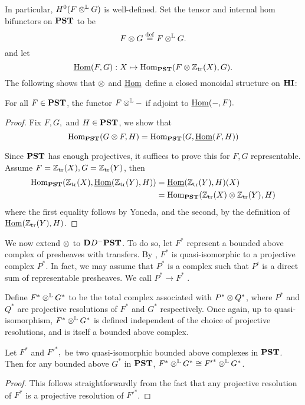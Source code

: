 In particular, $H^0(F \otimes^{\mathbb{L}} G)$ is well-defined. Set the tensor and
internal hom bifunctors on $\mathbf{PST}$ to be
\[
F \otimes G \stackrel{\mathrm{def}}{=} F \otimes^{\mathbb{L}} G.
\]
and let 
\[
\underline{\mathrm{Hom}}(F, G): X \mapsto \mathrm{Hom}_{\mathbf{PST}}(F \otimes \mathbb{Z}_{\mathrm{tr}}(X), G).
\]
The following shows that $\otimes$ and $\underline{\mathrm{Hom}}$ define a closed
monoidal structure on $\mathbf{HI}$:
\begin{lem}
For all $F \in \mathbf{PST}$, the functor $F \otimes^{\mathbb{L}} -$ if adjoint to 
$\underline{\mathrm{Hom}}(-, F).$
\end{lem}
\begin{proof}
Fix $F, G,$ and $H \in \mathbf{PST}$, we show that
\[
\mathrm{Hom}_{\mathbf{PST}}(G \otimes F, H) = \mathrm{Hom}_{\mathbf{PST}}(G, \underline{\mathrm{Hom}}(F, H))
\]

Since $\mathbf{PST}$ has enough projectives, it suffices to prove this 
for $F, G$ representable. Assume $F = \mathbb{Z}_{\mathrm{tr}}(X), G = \mathbb{Z}_{\mathrm{tr}}(Y)$,
then 
\begin{align*}
\mathrm{Hom}_{\mathbf{PST}}(\mathbb{Z}_{\mathrm{tr}}(X), \underline{\mathrm{Hom}}(\mathbb{Z}_{\mathrm{tr}}(Y), H)) &=
\underline{\mathrm{Hom}}(\mathbb{Z}_{\mathrm{tr}}(Y), H)(X) \\
&= \mathrm{Hom}_{\mathbf{PST}}(\mathbb{Z}_{\mathrm{tr}}(X) \otimes \mathbb{Z}_{\mathrm{tr}}(Y), H)
\end{align*}
where the first equality follows by Yoneda, and the second, by
the definition of $\underline{\mathrm{Hom}}(\mathbb{Z}_{\mathrm{tr}}(Y), H)$.
\end{proof}

We now extend $\otimes$ to $\mathbf{D}{D}^-\mathbf{PST}$. To do so, let $F^*$ 
represent a bounded above complex of presheaves with transfers.
By \cite[10.something]{WH}, $F^*$ is quasi-isomorphic to a 
projective complex $P^*$. In fact, we may assume that $P^*$ is a 
complex such that $P^i$ is a direct sum of representable 
presheaves. We call $P^* \to F^*$ .

Define $F^* \otimes^{\mathbb{L}} G^*$ to be the total complex associated with
$P^* \otimes Q^*$, where $P^*$ and $Q^*$ are projective 
resolutions of $F^*$ and $G^*$ respectively. Once again, up to
quasi-isomorphism, $F^* \otimes^{\mathbb{L}} G^*$ is defined independent of the 
choice of projective resolutions, and is itself a bounded above 
complex. 

\begin{lem}
Let $F^*$ and ${F'}^*,$ be two quasi-isomorphic bounded above 
complexes in $\mathbf{PST}$. Then for any bounded above $G^*$ in $\mathbf{PST}$,
$F^* \otimes^{\mathbb{L}} G^* \cong {F'}^* \otimes^{\mathbb{L}} G^*$.
\end{lem}
\begin{proof}
This follows straightforwardly from the fact that any projective
resolution of $F^*$ is a projective resolution of ${F'}^*$.
\end{proof}

